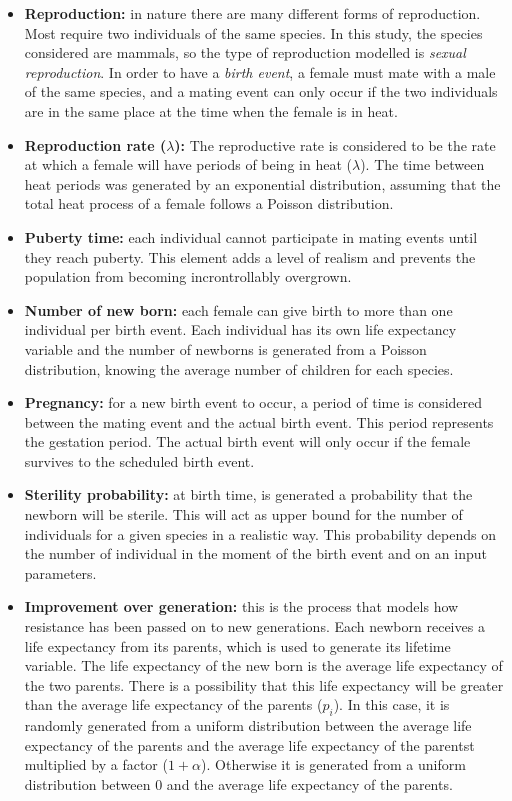 \documentclass[conference]{IEEEtran}
\begin{document}
    \begin{itemize}
        \item \textbf{Reproduction:} in nature there are many different forms of reproduction. Most require two individuals of the same species.
        In this study, the species considered are mammals, so the type of reproduction modelled is \textit{sexual reproduction}.  
        In order to have a \textit{birth event}, a female must mate with a male of the same species, and a mating event can only occur if the two individuals are in the same place at the time when the female is in heat. 
        \item \textbf{Reproduction rate ($\lambda$):} The reproductive rate is considered to be the rate at which a female will have periods of being in heat ($\lambda$). The time between heat periods was generated by an exponential distribution, assuming that the total heat process of a female follows a Poisson distribution.
        \item \textbf{Puberty time:} each individual cannot participate in mating events until they reach puberty. This element adds a level of realism and prevents the population from becoming incrontrollably overgrown.
        \item \textbf{Number of new born:} each female can give birth to more than one individual per birth event. Each individual has its own life expectancy variable and the number of newborns is generated from a Poisson distribution, knowing the average number of children for each species.
        \item \textbf{Pregnancy:} for a new birth event to occur, a period of time is considered between the mating event and the actual birth event. This period represents the gestation period. The actual birth event will only occur if the female survives to the scheduled birth event. 
        \item \textbf{Sterility probability:} at birth time, is generated a probability that the newborn will be sterile. This will act as upper bound for the number of individuals for a given species in a realistic way. This probability depends on the number of individual in the moment of the birth event and on an input parameters.
        \item \textbf{Improvement over generation:} this is the process that models how resistance has been passed on to new generations. Each newborn receives a life expectancy from its parents, which is used to generate its lifetime variable. The life expectancy of the new born is the average life expectancy of the two parents. There is a possibility that this life expectancy will be greater than the average life expectancy of the parents ($p_i$). In this case, it is randomly generated from a uniform distribution between the average life expectancy of the parents and the average life expectancy of the parentst multiplied by a factor ($1+\alpha$). Otherwise it is generated from a uniform distribution between 0 and the average life expectancy of the parents.
    \end{itemize}
\end{document}
